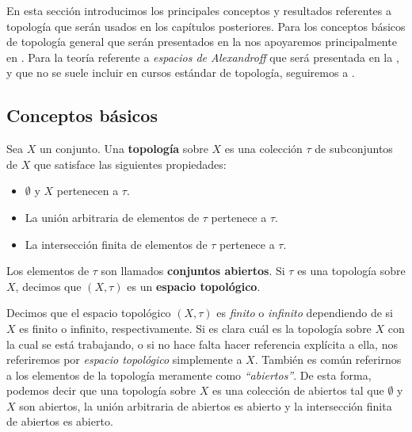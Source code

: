 En esta sección introducimos los principales conceptos y resultados referentes a topología que serán usados en los capítulos posteriores. Para los conceptos básicos de topología general que serán presentados en la  nos apoyaremos principalmente en \cite{munkres2000}. Para la teoría referente a \textit{espacios de Alexandroff} que será presentada en la , y que no se suele incluir en cursos estándar de topología, seguiremos a \cite{mesa2019}.
\subsection{Conceptos básicos}\label{subsec:topologia_general}
\begin{Def}
   Sea $X$ un conjunto. Una \textbf{topología} sobre $X$ es una colección $\tau$ de subconjuntos de $X$ que satisface las siguientes propiedades:
   \begin{itemize}
      \item[1.] $\emptyset$ y $X$ pertenecen a $\tau$.
      \item[2.] La unión arbitraria de elementos de $\tau$ pertenece a $\tau$.
      \item[3.] La intersección finita de elementos de $\tau$ pertenece a $\tau$.
   \end{itemize}
   Los elementos de $\tau$ son llamados \textbf{conjuntos abiertos}. Si $\tau$ es una topología sobre $X$, decimos que $(X,\tau)$ es un \textbf{espacio topológico}.
\end{Def}
\begin{Obs}
   Decimos que el espacio topológico $(X,\tau)$ es \textit{finito} o \textit{infinito} dependiendo de si $X$ es finito o infinito, respectivamente. Si es clara cuál es la topología sobre $X$ con la cual se está trabajando, o si no hace falta hacer referencia explícita a ella, nos referiremos por \textit{espacio topológico} simplemente a $X$. También es común referirnos a los elementos de la topología meramente como \textit{``abiertos''}. De esta forma, podemos decir que una topología sobre $X$ es una colección de abiertos tal que $\emptyset$ y $X$ son abiertos, la unión arbitraria de abiertos es abierto y la intersección finita de abiertos es abierto.
\end{Obs}
